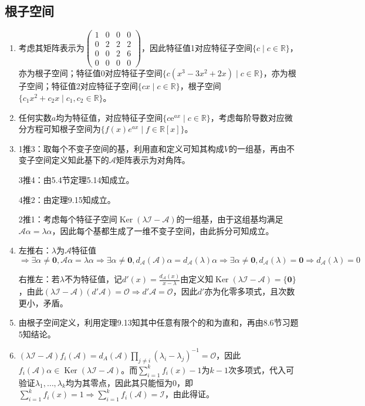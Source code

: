 \documentclass[a4paper,UTF8,fontset=windows]{ctexart}
\DeclareMathOperator{\Ker}{Ker}
\begin{document}
\subsection{根子空间}
\begin{enumerate}
\item
考虑其矩阵表示为$\begin{pmatrix}1&0&0&0\\0&2&2&2\\0&0&2&6\\0&0&0&0\end{pmatrix}$，因此特征值1对应特征子空间$\{c\mid c\in\mathbb{R}\}$，亦为根子空间；特征值0对应特征子空间$\{c(x^3-3x^2+2x)\mid c\in\mathbb{R}\}$，亦为根子空间；特征值2对应特征子空间$\{cx\mid c\in\mathbb{R}\}$，根子空间$\{c_1x^2+c_2x\mid c_1,c_2\in\mathbb{R}\}$。

\item
任何实数$a$均为特征值，对应特征子空间$\{c\mathrm{e}^{ax}\mid c\in\mathbb{R}\}$，考虑每阶导数对应微分方程可知根子空间为$\{f(x)e^{ax}\mid f\in\mathbb{R}[x]\}$。

\item
1推3：取每个不变子空间的基，利用直和定义可知其构成$V$的一组基，再由不变子空间定义知此基下的$\mathcal{A}$矩阵表示为对角阵。

3推4：由5.4节定理5.14知成立。

4推2：由定理9.15知成立。

2推1：考虑每个特征子空间$\Ker(\lambda\mathcal{I}-\mathcal{A})$的一组基，由于这组基均满足$\mathcal{A}\alpha=\lambda\alpha$，因此每个基都生成了一维不变子空间，由此拆分可知成立。

\item
左推右：$\lambda$为$\mathcal{A}$特征值$\Rightarrow\exists\alpha\ne\mathbf{0},\mathcal{A}\alpha=\lambda\alpha\Rightarrow\exists\alpha\ne\mathbf{0},d_\mathcal{A}(\mathcal{A})\alpha=d_\mathcal{A}(\lambda)\alpha\Rightarrow\exists\alpha\ne\mathbf{0},d_\mathcal{A}(\lambda)=\mathbf{0}\Rightarrow d_\mathcal{A}(\lambda)=0$

右推左：若$\lambda$不为特征值，记$d'(x)=\frac{d_\mathcal{A}(x)}{x-\lambda}$由定义知$\Ker(\lambda\mathcal{I}-\mathcal{A})=\{\mathbf{0}\}$，由此$(\lambda\mathcal{I}-\mathcal{A})(d'\mathcal{A})=\mathcal{O}\Rightarrow d'\mathcal{A}=\mathcal{O}$，因此$d'$亦为化零多项式，且次数更小，矛盾。

\item
由根子空间定义，利用定理9.13知其中任意有限个的和为直和，再由8.6节习题5知结论。

\item
$(\lambda\mathcal{I}-\mathcal{A})f_i(\mathcal{A})=d_A(\mathcal{A})\prod_{j\ne i}(\lambda_i-\lambda_j)^{-1}=\mathcal{O}$，因此$f_i(\mathcal{A})\alpha\in\Ker(\lambda\mathcal{I}-\mathcal{A})$。而$\sum_{i=1}^kf_i(x)-1$为$k-1$次多项式，代入可验证$\lambda_1,\dots,\lambda_k$均为其零点，因此其只能恒为0，即$\sum_{i=1}^kf_i(x)=1\Rightarrow\sum_{i=1}^kf_i(\mathcal{A})=\mathcal{I}$，由此得证。


\end{enumerate}
\end{document}
